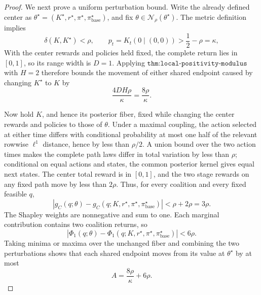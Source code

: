 \documentclass{article}
\begin{document}
\begin{proof}
We next prove a uniform perturbation bound.  Write the already defined center as \(\theta^\star=(K^\star,r^\star,\pi^\star,\pi_{\mathrm{base}}^\star)\), and fix \(\theta\in\mathcal N_\rho(\theta^\star)\).  The metric definition implies
\[
 \delta(K,K^\star)<\rho,
 \qquad
 p_t=K_t(0\mid(0,0))>\frac12-\rho=\kappa,
\]
With the center rewards and policies held fixed, the complete return lies in \([0,1]\), so its range width is \(D=1\).  Applying \(\texttt{thm:local-positivity-modulus}\) with \(H=2\) therefore bounds the movement of either shared endpoint caused by changing \(K^\star\) to \(K\) by
\[
 \frac{4DH\rho}{\kappa}=\frac{8\rho}{\kappa}.
\]

Now hold \(K\), and hence its posterior fiber, fixed while changing the center rewards and policies to those of \(\theta\).  Under a maximal coupling, the action selected at either time differs with conditional probability at most one half of the relevant rowwise \(\ell^1\) distance, hence by less than \(\rho/2\).  A union bound over the two action times makes the complete path laws differ in total variation by less than \(\rho\); conditional on equal actions and states, the common posterior kernel gives equal next states.  The center total reward is in \([0,1]\), and the two stage rewards on any fixed path move by less than \(2\rho\).  Thus, for every coalition and every fixed feasible \(q\),
\[
 |g_C(q;\theta)-g_C(q;K,r^\star,\pi^\star,\pi_{\mathrm{base}}^\star)|
 <\rho+2\rho=3\rho.
\]
The Shapley weights are nonnegative and sum to one.  Each marginal contribution contains two coalition returns, so
\[
 |\Phi_1(q;\theta)-\Phi_1(q;K,r^\star,\pi^\star,\pi_{\mathrm{base}}^\star)|<6\rho.
\]
Taking minima or maxima over the unchanged fiber and combining the two perturbations shows that each shared endpoint moves from its value at \(\theta^\star\) by at most
\[
 A=\frac{8\rho}{\kappa}+6\rho.
\]


\end{proof}
\end{document}
